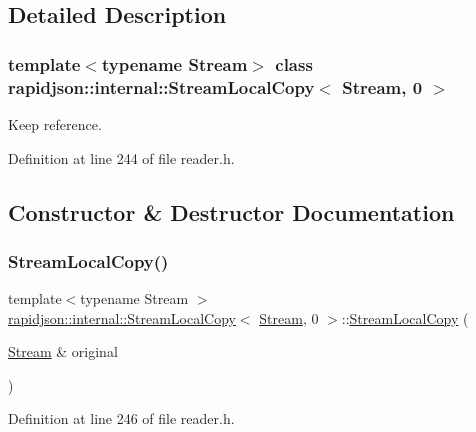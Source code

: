 \subsection{Detailed Description}
\subsubsection*{template$<$typename Stream$>$\newline
class rapidjson\+::internal\+::\+Stream\+Local\+Copy$<$ Stream, 0 $>$}

Keep reference. 

Definition at line 244 of file reader.\+h.



\subsection{Constructor \& Destructor Documentation}
\mbox{\label{classrapidjson_1_1internal_1_1_stream_local_copy_3_01_stream_00_010_01_4_aed4e6505b258c78f869c200e2f60388b}} 
\subsubsection{\texorpdfstring{StreamLocalCopy()}{StreamLocalCopy()}}
{\footnotesize\ttfamily template$<$typename Stream $>$ \\
\mbox{\hyperlink{classrapidjson_1_1internal_1_1_stream_local_copy}{rapidjson\+::internal\+::\+Stream\+Local\+Copy}}$<$ \mbox{\hyperlink{classrapidjson_1_1_stream}{Stream}}, 0 $>$\+::\mbox{\hyperlink{classrapidjson_1_1internal_1_1_stream_local_copy}{Stream\+Local\+Copy}} (\begin{DoxyParamCaption}\item[{\mbox{\hyperlink{classrapidjson_1_1_stream}{Stream}} \&}]{original }\end{DoxyParamCaption})}



Definition at line 246 of file reader.\+h.


\begin{DoxyCode}{0}

\end{DoxyCode}



